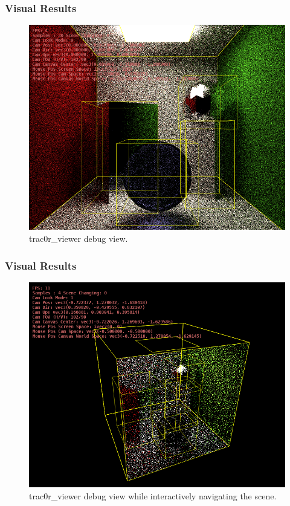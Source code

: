 \documentclass{beamer}
\begin{document}
\begin{frame}[shrink]
    \frametitle{Visual Results}
    \begin{figure}[H]
        \includegraphics[scale=0.5]{trac0r-debug1.png}
        \centering
        \caption{trac0r\_viewer debug view.}
    \end{figure}
\end{frame}

\begin{frame}[shrink]
    \frametitle{Visual Results}
    \begin{figure}[H]
        \includegraphics[scale=0.5]{trac0r-debug2.png}
        \centering
        \caption{trac0r\_viewer debug view while interactively navigating the scene.}
    \end{figure}
\end{frame}
\end{document}
